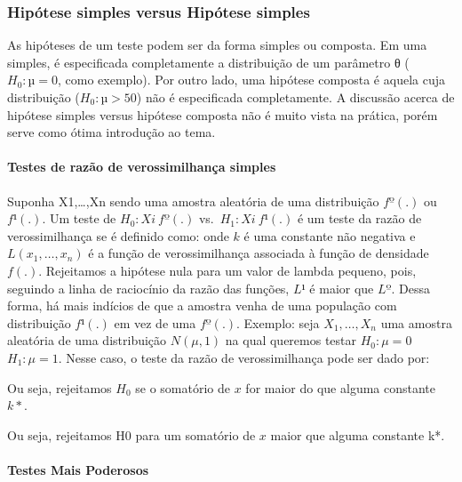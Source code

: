 \documentclass[
]{article}
\begin{document}
\hypertarget{hipuxf3tese-simples-versus-hipuxf3tese-simples}{%
\subsubsection{Hipótese simples versus Hipótese
simples}\label{hipuxf3tese-simples-versus-hipuxf3tese-simples}}

As hipóteses de um teste podem ser da forma simples ou composta. Em uma
simples, é especificada completamente a distribuição de um parâmetro θ
(\(H_0: µ = 0\), como exemplo). Por outro lado, uma hipótese composta é
aquela cuja distribuição (\(H_0:µ >50\)) não é especificada
completamente. A discussão acerca de hipótese simples versus hipótese
composta não é muito vista na prática, porém serve como ótima introdução
ao tema.

\hypertarget{testes-de-razuxe3o-de-verossimilhanuxe7a-simples}{%
\paragraph{Testes de razão de verossimilhança
simples}\label{testes-de-razuxe3o-de-verossimilhanuxe7a-simples}}

Suponha X1,\ldots,Xn sendo uma amostra aleatória de uma distribuição
\(fº(.)\) ou \(f¹(.)\). Um teste de \(H_0: Xi ~ fº(.)\)
vs.~\(H_1: Xi ~ f¹(.)\) é um teste da razão de verossimilhança se é
definido como: onde \(k\) é uma constante não negativa e
\(L(x_1,…,x_n)\) é a função de verossimilhança associada à função de
densidade \(f(.)\). Rejeitamos a hipótese nula para um valor de lambda
pequeno, pois, seguindo a linha de raciocínio da razão das funções,
\(L¹\) é maior que \(Lº\). Dessa forma, há mais indícios de que a
amostra venha de uma população com distribuição \(f¹(.)\) em vez de uma
\(fº(.)\). Exemplo: seja \(X_1,…,X_n\) uma amostra aleatória de uma
distribuição \(N(μ,1)\) na qual queremos testar \(H_0: μ = 0\)
\times \(H_1: μ = 1\). Nesse caso, o teste da razão de verossimilhança
pode ser dado por:

Ou seja, rejeitamos \(H_0\) se o somatório de \(x\) for maior do que
alguma constante \(k*\).

Ou seja, rejeitamos H0 para um somatório de \(x\) maior que alguma
constante k*.

\hypertarget{testes-mais-poderosos}{%
\paragraph{Testes Mais Poderosos}\label{testes-mais-poderosos}}
\end{document}
